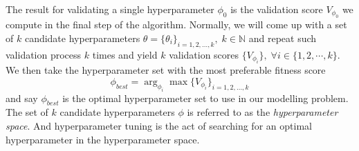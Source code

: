 The result for validating a single hyperparameter $\phi_0$ is the validation score $V_{\phi_0}$ we compute in the final step of the algorithm. Normally, we will come up with a set of $k$ candidate hyperparameters $\theta = \{ \theta_i \}_{i = 1, 2, \ldots, k}, \; k \in \mathbb{N}$ and repeat such validation process $k$ times and yield $k$ validation scores $\{ V_{\phi_i} \}, \; \forall i \in \{1, 2, \cdots, k \}$. We then take the hyperparameter set with the most preferable fitness score
\begin{equation*} 
    \phi_{best} = \arg_{\phi_i} \max \{ V_{\phi_i} \}_{i = 1, 2, \ldots, k}
\end{equation*}
and say $\phi_{best}$ is the optimal hyperparameter set to use in our modelling problem. The set of $k$ candidate hyperparameters $\phi$ is referred to as the \textit{hyperparameter space}. And hyperparameter tuning is the act of searching for an optimal hyperparameter in the hyperparameter space.

